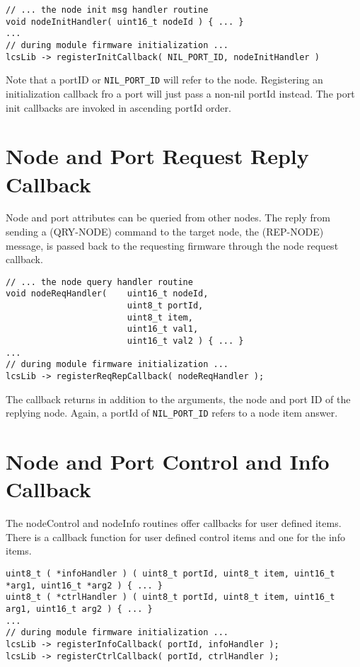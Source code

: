 \lstset{style=codesnippetstyle}
\begin{lstlisting}
// ... the node init msg handler routine
void nodeInitHandler( uint16_t nodeId ) { ... }
...
// during module firmware initialization ...
lcsLib -> registerInitCallback( NIL_PORT_ID, nodeInitHandler )
\end{lstlisting}

Note that a portID or \texttt{NIL\_PORT\_ID} will refer to the node. Registering an initialization callback fro a port will just pass a non-nil portId instead. The port init callbacks are invoked in ascending portId order.

\section{Node and Port Request Reply Callback}

Node and port attributes can be queried from other nodes. The reply from sending a (QRY-NODE) command to the target node, the (REP-NODE) message, is passed back to the requesting firmware through the node request callback.

\lstset{style=codesnippetstyle}
\begin{lstlisting}
// ... the node query handler routine
void nodeReqHandler(    uint16_t nodeId, 
                        uint8_t portId, 
                        uint8_t item, 
                        uint16_t val1, 
                        uint16_t val2 ) { ... }
...
// during module firmware initialization ...
lcsLib -> registerReqRepCallback( nodeReqHandler );
\end{lstlisting}

The callback returns in addition to the arguments, the node and port ID of the replying node. Again, a portId of \texttt{NIL\_PORT\_ID} refers to a node item answer.

\section{Node and Port Control and Info Callback}

The nodeControl and nodeInfo routines offer callbacks for user defined items. There is a callback function for user defined control items and one for the info items.

\lstset{style=codesnippetstyle}
\begin{lstlisting}
uint8_t ( *infoHandler ) ( uint8_t portId, uint8_t item, uint16_t *arg1, uint16_t *arg2 ) { ... }
uint8_t ( *ctrlHandler ) ( uint8_t portId, uint8_t item, uint16_t arg1, uint16_t arg2 ) { ... }
...
// during module firmware initialization ...
lcsLib -> registerInfoCallback( portId, infoHandler );
lcsLib -> registerCtrlCallback( portId, ctrlHandler );
\end{lstlisting}

